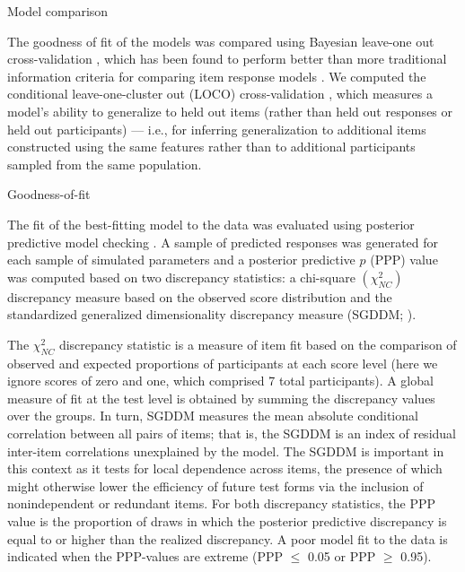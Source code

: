 \documentclass[a4paper,man,natbib]{apa6}
\makeatletter
\renewcommand{\subsubsection}{\@startsection{subsubsection}{3}
  {\z@}%
  {\b@level@two@skip}{\e@level@two@skip}%
  {\normalfont\normalsize\bfseries}}
\makeatother
\begin{document}
\subsubsection{Model comparison}

The goodness of fit of the models was compared using Bayesian leave-one out cross-validation \citep{vehtari2017practical}, which has been found to perform better than more traditional information criteria for comparing item response models \citep{luo2017performances}. We computed the conditional leave-one-cluster out (LOCO) cross-validation \citep{merkle2019bayesian}, which measures a model's ability to generalize to held out items (rather than held out responses or held out participants) --- i.e., for inferring generalization to additional items constructed using the same features rather than to additional participants sampled from the same population.

\subsubsection{Goodness-of-fit}

The fit of the best-fitting model to the data was evaluated using posterior predictive model checking \citep{gelman1996posterior, levy2017bayesian}. A sample of predicted responses was generated for each sample of simulated parameters and a posterior predictive $p$ (PPP) value was computed based on two discrepancy statistics: a chi-square $\left( \chi^2_{NC} \right)$ discrepancy measure based on the observed score distribution \citep{sinharay2006posterior} and the standardized generalized dimensionality discrepancy measure (SGDDM; \citealt{levy2015standardized}). 

The $\chi^2_{NC}$ discrepancy statistic is a measure of item fit based on the comparison of observed and expected proportions of participants at each score level (here we ignore scores of zero and one, which comprised 7 total participants). A global measure of fit at the test level is obtained by summing the discrepancy values over the groups. In turn, SGDDM measures the mean absolute conditional correlation between all pairs of items; that is, the SGDDM is an index of residual inter-item correlations unexplained by the model. The SGDDM is important in this context as it tests for local dependence across items, the presence of which might otherwise lower the efficiency of future test forms via the inclusion of nonindependent or redundant items. For both discrepancy statistics, the PPP value is the proportion of draws in which the posterior predictive discrepancy is equal to or higher than the realized discrepancy. A poor model fit to the data is indicated when the PPP-values are extreme (PPP $\leq$ 0.05 or PPP $\geq$ 0.95).
\end{document}

